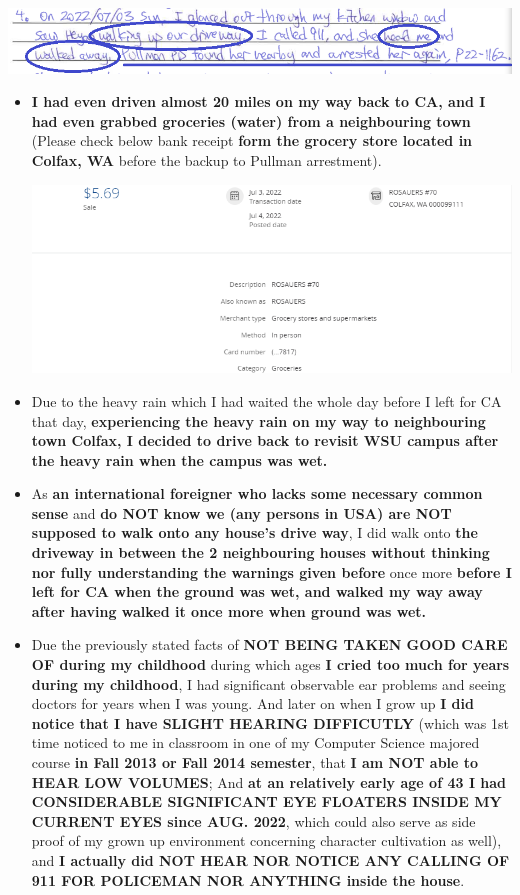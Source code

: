 \documentclass[9pt, b5paper]{article}
\begin{document}
\includegraphics[width=.9\linewidth]{./pic/dearCousin_20220920_142827.png}
\begin{itemize}
\item \textbf{I had even driven almost 20 miles on my way back to CA, and I had even grabbed groceries (water) from a neighbouring town} (Please check below bank receipt \textbf{form the grocery store located in Colfax, WA} before the backup to Pullman arrestment).

\includegraphics[width=.9\linewidth]{./pic/dearCousin_20220919_201117.png}
\item Due to the heavy rain which I had waited the whole day before I left for CA that day, \textbf{experiencing the heavy rain on my way to neighbouring town Colfax, I decided to drive back to revisit WSU campus after the heavy rain when the campus was wet.}
\item As \textbf{an international foreigner who lacks some necessary common sense} and \textbf{do NOT know we (any persons in USA) are NOT supposed to walk onto any house's drive way}, I did walk onto \textbf{the driveway in between the 2 neighbouring houses without thinking nor fully understanding the warnings given before} once more \textbf{before I left for CA when the ground was wet, and walked my way away after having walked it once more when ground was wet.}
\item Due the previously stated facts of \textbf{NOT BEING TAKEN GOOD CARE OF during my childhood} during which ages \textbf{I cried too much for years during my childhood}, I had significant observable ear problems and seeing doctors for years when I was young. And later on when I grow up \textbf{I did notice that I have SLIGHT HEARING DIFFICUTLY} (which was 1st time noticed to me in classroom in one of my Computer Science majored course \textbf{in Fall 2013 or Fall 2014 semester}, that \textbf{I am NOT able to HEAR LOW VOLUMES}; And \textbf{at an relatively early age of 43 I had CONSIDERABLE SIGNIFICANT EYE FLOATERS INSIDE MY CURRENT EYES since AUG. 2022}, which could also serve as side proof of my grown up environment concerning character cultivation as well), and \textbf{I actually did NOT HEAR NOR NOTICE ANY CALLING OF 911 FOR POLICEMAN NOR ANYTHING inside the house}.

\end{itemize}
\end{document}
